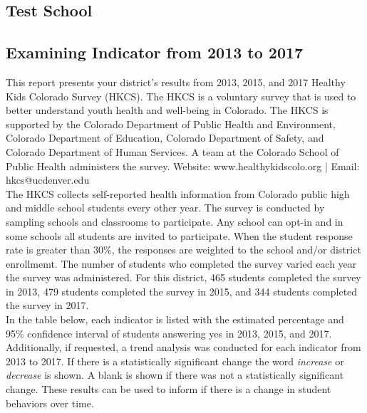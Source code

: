 \documentclass[11pt]{article}
\begin{document}



\begin{center}
  \section*{Test School}
  \subsection*{Examining Indicator from 2013 to 2017}
\end{center}
\vspace{-0.5cm}
\noindent\makebox[\linewidth]{\rule{\paperwidth}{1pt}}

\vspace{0.15in}
\noindent This report presents your district's results from 2013, 2015, and 2017 Healthy Kids Colorado Survey (HKCS). The HKCS is a voluntary survey that is used to better understand youth health and well-being in Colorado. The HKCS is supported by the Colorado Department of Public Health and Environment, Colorado Department of Education, Colorado Department of Safety, and Colorado Department of Human Services. A team at the Colorado School of Public Health administers the survey. Website: www.healthykidscolo.org | Email: hkcs@ucdenver.edu \\

\noindent The HKCS collects self-reported health information from Colorado public high and middle school students every other year. The survey is conducted by sampling schools and classrooms to participate. Any school can opt-in and in some schools all students are invited to participate. When the student response rate is greater than 30\%, the responses are weighted to the school and/or district enrollmemt. The number of students who completed the survey varied each year the survey was administered. For this district, 465 students completed the survey in 2013, 479 students completed the survey in 2015, and 344 students completed the survey in 2017.\\

\noindent In the table below, each indicator is listed with the estimated percentage and 95\% confidence interval of students answering yes in 2013, 2015, and 2017. Additionally, if requested, a trend analysis was conducted for each indicator from 2013 to 2017. If there is a statistically significant change the word \textit{increase} or \textit{decrease} is shown. A blank is shown if there was not a statistically significant change. These results can be used to inform if there is a change in student behaviors over time.
\end{document}
